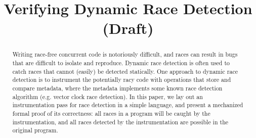 \documentclass[preprint, 10pt]{sigplanconf}
\newcommand{\ignore}[1]{}
\begin{document}
\setlength{\pdfpageheight}{\paperheight}
\setlength{\pdfpagewidth}{\paperwidth}





\titlebanner{}        %
\preprintfooter{}   %

\title{Verifying Dynamic Race Detection (Draft)}
\ignore{\authorinfo{William Mansky \and Yuanfeng Peng \and Steve Zdancewic \and Joseph Devietti}
           {University of Pennsylvania}
           {wmansky@seas.upenn.edu, yuanfeng@cis.upenn.edu, stevez@cis.upenn.edu, devietti@cis.upenn.edu}}
\authorinfo{}{}{}
\maketitle

\begin{abstract}
Writing race-free concurrent code is notoriously difficult, and races can result in bugs that are difficult to isolate and reproduce. Dynamic race detection is often used to catch races that cannot (easily) be detected statically. One approach to dynamic race detection is to instrument the potentially racy code with operations that store and compare metadata, where the metadata implements some known race detection algorithm (e.g. vector clock race detection). In this paper, we lay out an instrumentation pass for race detection in a simple language, and present a mechanized formal proof of its correctness: all races in a program will be caught by the instrumentation, and all races detected by the instrumentation are possible in the original program.
\end{abstract}


\end{document}

